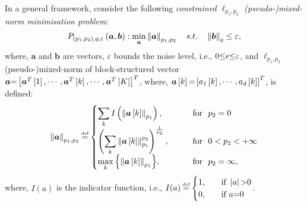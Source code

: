 In a general framework, consider the following \emph{constrained $\ell_{p_1,p_2}$ (pseudo-)mixed-norm minimisation problem}:
\begin{equation}
\label{eq:Opt-Lp1p2}
P_{\left( p_1,p_2 \right),q,\varepsilon} \left( \boldsymbol{a},\boldsymbol{b} \right): \min_{\boldsymbol{a}} \left\lVert\boldsymbol{a}\right\rVert_{p_1,p_2} \quad s.t. \quad \left\lVert\boldsymbol{b}\right\rVert_q \leq \varepsilon,
\end{equation}
where, $\boldsymbol{a}$ and $\boldsymbol{b}$ are vectors, $\varepsilon$ bounds the noise level, i.e., $0 {\leq} \epsilon {\leq} \varepsilon$, and $\ell_{p_1,p_2}$ (pseudo-)mixed-norm of block-structured vector $\boldsymbol{a} {=} \left[ \boldsymbol{a}^T\left[ 1 \right], \cdots, \boldsymbol{a}^T\left[ k \right], \cdots, \boldsymbol{a}^T\left[ K \right] \right]^T$, where, $\boldsymbol{a} \left[ k \right] {=} \left[ a_1\left[ k \right], \cdots, a_{d} \left[ k \right] \right]^T$, is defined:
\begin{equation*}
\label{eq:MixedNormDef} 
\mynorm{\boldsymbol{a}}_{p_1,p_2} \myeq 
\begin{cases}
    \displaystyle\sum_{k}^{} I \myparanthese{\mynorm{\boldsymbol{a} \mybracket{k}}_{p_1}}, & \qquad \text{for \ }p_2= 0\\
    \myparanthese{\displaystyle\sum_{k}^{} \mynorm{\boldsymbol{a} \mybracket{k}}_{p_1}^ {p_2}} ^ {\frac{1}{p_2}},  & \qquad  \text{for \ } 0 < p_2 < +\infty\\
    \displaystyle\max_{k}{\mybrace{\mynorm{\boldsymbol{a} \mybracket{k}}_{p_1}}}, & \qquad \text{for \ } p_2= \infty,
  \end{cases}
\end{equation*}
where, $I(a)$ is the indicator function, i.e., $I(a) \myeq
  \begin{cases}
    1,  & \quad \text{if } \myabs{a} \sg 0\\
    0,  & \quad \text{if } a \seq 0\\
  \end{cases}$.
